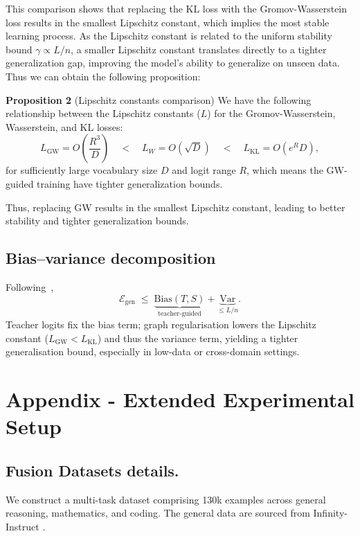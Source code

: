 \documentclass{article}
\begin{document}
This comparison shows that replacing the KL loss with the Gromov-Wasserstein loss results in the smallest Lipschitz constant, which implies the most stable learning process.  
As the Lipschitz constant is related to the uniform stability bound $\gamma \propto L/n$, a smaller Lipschitz constant translates directly to a tighter generalization gap, improving the model's ability to generalize on unseen data. Thus we can obtain the following proposition:


\textbf{Proposition 2} (Lipschitz constants comparison)
We have the following relationship between the Lipschitz constants ($L$) for the Gromov-Wasserstein, Wasserstein, and KL losses:
\[
  L_{\mathrm{GW}} = O\left(\frac{R^3}{D}\right)
  \quad < \quad
  L_{W} = O(\sqrt{D})
  \quad < \quad
  L_{\mathrm{KL}} = O(e^{R} D),
\]
for sufficiently large vocabulary size $D$ and logit range $R$, which means the GW-guided training have tighter generalization bounds.

Thus, replacing GW results in the smallest Lipschitz constant, leading to better stability and tighter generalization bounds.


\subsection{Bias–variance decomposition}
Following~\cite{safaryan2023knowledge},
\[
  \mathcal{E}_{\text{gen}}
  \;\le\;
  \underbrace{\mathrm{Bias}(T,S)}_{\text{teacher-guided}}
  +
  \underbrace{\mathrm{Var}}_{\le L/n}.
\]
Teacher logits fix the bias term;
graph regularisation lowers the Lipschitz constant
(\(L_{\mathrm{GW}} < L_{\mathrm{KL}}\))
and thus the variance term,
yielding a tighter generalisation bound,
especially in low-data or cross-domain settings.




\section{Appendix - Extended Experimental Setup}
\label{app:setup}
\subsection{Fusion Datasets details.}
\label{app:dataset}
We construct a multi-task dataset comprising 130k examples across general reasoning, mathematics, and coding. The general data are sourced from Infinity-Instruct \cite{li2024superfiltering}.
\end{document}
